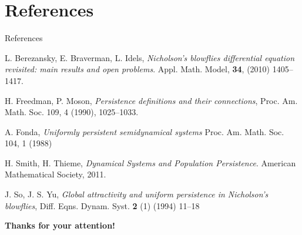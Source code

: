 \documentclass[spanish]{beamer}
\begin{document}
\section{References}
\begin{frame}[allowframebreaks]{References}
\begin{thebibliography}{99}
{\fontsize{10}{10} \selectfont


\beamertemplatearticlebibitems

 L. Berezansky, E. Braverman, L.  Idels,  
 {\em Nicholson's blowflies differential equation revisited: main results and open problems}. Appl. Math. Model,  {\bf 34}, (2010) 1405--1417.
 
 \beamertemplatearticlebibitems

H. Freedman, P. Moson, {\em Persistence definitions and their connections}, Proc. Am. Math. Soc. 109, 4 (1990), 1025--1033. 
 
\beamertemplatearticlebibitems

A. Fonda, 
{\em Uniformly persistent semidynamical systems}
Proc. Am. Math. Soc.
104, 1 (1988)

\beamertemplatearticlebibitems

H. Smith, H. Thieme, {\em Dynamical Systems
and Population
Persistence}. 
American Mathematical Society, 2011. 

\beamertemplatearticlebibitems

  J. So, J. S. Yu, {\em Global attractivity and uniform persistence in Nicholson's blowflies}, Diff. Eqns. Dynam. Syst. {\bf 2} (1) (1994) 11--18
  
}

\end{thebibliography}
\end{frame}

\begin{frame}
 \begin{center}
  \LARGE{{\bf Thanks for your attention!}}
 \end{center}
\end{frame}
\end{document}
